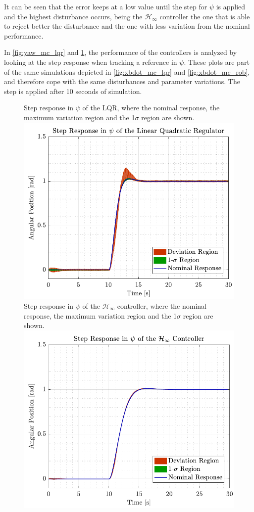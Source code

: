 It can be seen that the error keeps at a low value until the step for $\psi$ is applied and the highest disturbance occurs, being the $\mathcal{H}_\infty$ controller the one that is able to reject better the disturbance and the one with less variation from the nominal performance.

In \autoref{fig:yaw_mc_lqr} and \ref{fig:yaw_mc_rob}, the performance of the controllers is analyzed by looking at the step response when tracking a reference in $\psi$. These plots are part of the same simulations depicted in \autoref{fig:xbdot_mc_lqr} and \ref{fig:xbdot_mc_rob}, and therefore cope with the same disturbances and parameter variations. The step is applied after 10 seconds of simulation.
\begin{figure}[H]
    \captionbox 
    {   
        Step response in $\psi$ of the LQR, where the nominal response, the maximum variation region and the 1$\sigma$ region are shown.
        \label{fig:yaw_mc_lqr}
    }                                                                 
    {                                                                  
        \includegraphics[width=.45\textwidth]{figures/yaw_mc_lqr}         
    }                                                                    
    \hspace{5pt}                                                          
    \captionbox  
    {   
        Step response in $\psi$ of the $\mathcal{H}_\infty$ controller, where the nominal response, the maximum variation region and the 1$\sigma$ region are shown.   
        \label{fig:yaw_mc_rob}
    }                                                                          
    {
        \includegraphics[width=.45\textwidth]{figures/yaw_mc_rob}
    }
\end{figure}

